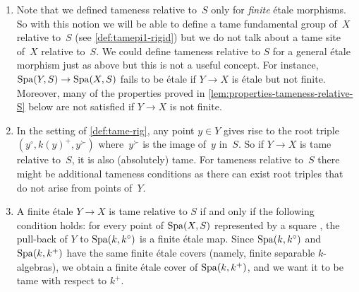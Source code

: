 \begin{rmks} \label{rmks:relative-tameness}
    \begin{enumerate}[(1)]
        \item Note that we defined tameness relative to~$S$ only for \emph{finite} étale morphisms. So with this notion we will be able to define a tame fundamental group of~$X$ relative to~$S$ (see \cref{def:tamepi1-rigid}) but we do not talk about a tame site of~$X$ relative to~$S$. We could define tameness relative to $S$ for a general étale morphism just as above but this is not a useful concept. For instance, $\operatorname{Spa}(Y,S) \to \operatorname{Spa}(X,S)$ fails to be étale if $Y \to X$ is étale but not finite. Moreover, many of the properties proved in \cref{lem:properties-tameness-relative-S} below are not satisfied if $Y\to X$ is not finite. 
        \item In the setting of \cref{def:tame-rig}, any point $y \in Y$ gives rise to the root triple $(y^\circ,k(y)^+,y^\succ)$ where~$y^\succ$ is the image of~$y$ in~$S$. So if $Y \to X$ is tame relative to~$S$, it is also (absolutely) tame. For tameness relative to~$S$ there might be additional tameness conditions as there can exist root triples that do not arise from points of~$Y$. 
        \item \label{enumitem:relative-tameness-test-square} A finite \'etale $Y\to X$ is tame relative to $S$ if and only if the following condition holds: for every point of $\operatorname{Spa}(X, S)$ represented by a square , the pull-back of $Y$ to $\operatorname{Spa}(k, k^\circ)$ is a finite \'etale map. Since $\operatorname{Spa}(k, k^\circ)$ and $\operatorname{Spa}(k, k^+)$ have the same finite \'etale covers (namely, finite separable $k$-algebras), we obtain a finite \'etale cover of $\operatorname{Spa}(k, k^+)$, and we want it to be tame with respect to $k^+$. 
    \end{enumerate}
\end{rmks}


